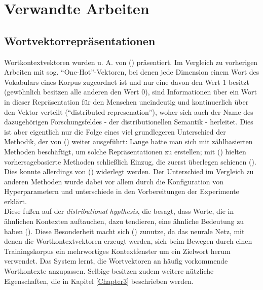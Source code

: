
\chapter{Verwandte Arbeiten} %

\label{Chapter2} %


\section{Wortvektorrepräsentationen}\label{sec:represent}

Wortkontextvektoren wurden u. A. von (\cite{bengio2006neural}) präsentiert. Im Vergleich zu vorherigen Arbeiten mit sog. ``One-Hot''-Vektoren, bei denen
jede Dimension einem Wort des Vokabulars eines Korpus zugeordnet ist und nur eine davon den Wert $1$ besitzt (gewöhnlich
besitzen alle anderen den Wert $0$), sind Informationen über ein Wort in dieser Repräsentation für den Menschen uneindeutig
und kontinuerlich über den Vektor verteilt (``distributed represenation''), woher sich auch der Name des dazugehörigen
Forschungsfeldes - der distributionellen Semantik - herleitet. Dies ist aber eigentlich nur die Folge eines viel
grundlegeren Unterschied der Methodik, der von (\cite{baroni2014don}) weiter ausgeführt: Lange hatte man sich
mit zählbasierten Methoden beschäftigt, um solche Repräsentationen zu erstellen; mit (\cite{bengio2006neural}) hielten
vorhersagebasierte Methoden schließlich Einzug, die zuerst überlegen schienen (\cite{baroni2014don}). Dies konnte
allerdings von (\cite{levy2015improving}) widerlegt werden. Der Unterschied im Vergleich zu anderen Methoden
wurde dabei vor allem durch die Konfiguration von Hyperparametern und unterschiede in den Vorbereitungen der Experimente
erklärt. \\

Diese fußen auf der \emph{distributional hypthesis}, die besagt, dass Worte, die in ähnlichen Kontexten auftauchen, dazu
 tendieren, eine ähnliche Bedeutung zu haben (\cite{harris1954distributional}).
Diese Besonderheit macht sich (\cite{bengio2006neural}) zunutze, da das neurale Netz, mit denen die Wortkontextvektoren
erzeugt werden, sich beim Bewegen durch einen Trainingskorpus ein mehrwortiges Kontextfenster um ein Zielwort herum
verwendet. Das System lernt, die Wortvektoren an häufig vorkommende Wortkontexte anzupassen. Selbige besitzen zudem
weitere nützliche Eigenschaften, die in Kapitel \ref{Chapter3} beschrieben werden.\\

